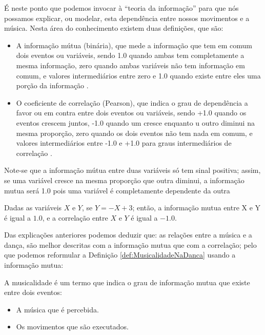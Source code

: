 É neste ponto que podemos invocar à ``teoria da informação'' para que nós possamos explicar,
ou modelar, esta dependência entre nossos movimentos e a música.
Nesta área do conhecimento existem duas definições, que são:
\begin{itemize} 
\item A informação mútua (binária), que mede a informação que tem em comum dois eventos ou variáveis,
sendo 1.0 quando ambas tem completamente a mesma informação,
zero quando ambas variáveis não tem informação em comum, 
e valores intermediários entre zero e 1.0 quando existe entre eles uma porção da informação \cite{reza2012introduction}. 
\item O coeficiente de correlação (Pearson), 
que indica o grau de dependência a favor ou em contra entre dois eventos ou variáveis,
sendo +1.0 quando os eventos crescem juntos, 
-1.0 quando um cresce enquanto u outro diminui na mesma proporção,
 zero quando os dois eventos não tem nada em comum, 
e valores intermediários entre -1.0 e +1.0 para graus intermediários de correlação \cite{reza2012introduction}.
\end{itemize} 

Note-se que a informação mútua entre duas variáveis só tem sinal positiva; assim,
se uma variável cresce na mesma proporção que outra diminui, 
a informação mutua será 1.0 pois uma variável é completamente dependente da outra
\begin{example}
Dadas as variáveis  $X$ e $Y$, se $Y=-X+3$; então,
a informação mutua entre X e Y é igual a $1.0$, e
a correlação entre $X$ e $Y$ é igual a $-1.0$.
\end{example}

Das explicações anteriores podemos deduzir que: as relações entre a música e a dança, 
são melhor descritas com a informação mutua  que com a correlação;
pelo que podemos reformular a Definição \ref{def:MusicalidadeNaDanca} usando a informação mutua:
\begin{definition} 
\label{def:MusicalidadeNaDancaIT}
A musicalidade é um termo que indica o grau de informação mutua que existe entre dois eventos: 
\begin{itemize}
\item A música que é percebida.
\item Os movimentos que são executados.
\end{itemize} 
\end{definition}


